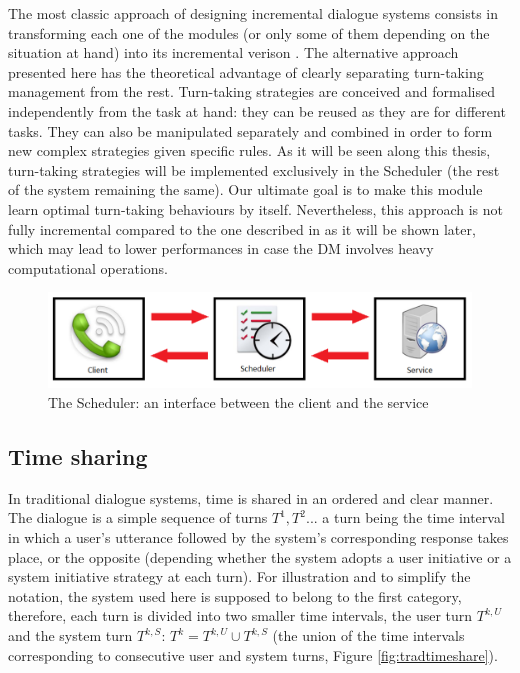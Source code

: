         The most classic approach of designing incremental dialogue systems consists in transforming each one of the modules (or only some of them depending on the situation at hand) into its incremental verison \cite{Schlangen2011}. The alternative approach presented here has the theoretical advantage of clearly separating turn-taking management from the rest. Turn-taking strategies are conceived and formalised independently from the task at hand: they can be reused as they are for different tasks. They can also be manipulated separately and combined in order to form new complex strategies given specific rules. As it will be seen along this thesis, turn-taking strategies will be implemented exclusively in the Scheduler (the rest of the system remaining the same). Our ultimate goal is to make this module learn optimal turn-taking behaviours by itself. Nevertheless, this approach is not fully incremental compared to the one described in \cite{Schlangen2011} as it will be shown later, which may lead to lower performances in case the DM involves heavy computational operations.
        
     	\begin{figure}[t]
          \centering
          \includegraphics[scale=0.4]{figures/ClientSchedService.pdf}
          \caption{The Scheduler: an interface between the client and the service}
          \label{fig:archioverview}
        \end{figure}
        
    \subsection{Time sharing}
    
    	In traditional dialogue systems, time is shared in an ordered and clear manner. The dialogue is a simple sequence of turns $T^1,T^2...$ a turn being the time interval in which a user's utterance followed by the system's corresponding response takes place, or the opposite (depending whether the system adopts a user initiative or a system initiative strategy at each turn). For illustration and to simplify the notation, the system used here is supposed to belong to the first category, therefore, each turn is divided into two smaller time intervals, the user turn $T^{k,U}$ and the system turn $T^{k,S}$: $T^k = T^{k,U} \cup T^{k,S}$ (the union of the time intervals corresponding to consecutive user and system turns, Figure \ref{fig:tradtimeshare}).
        
